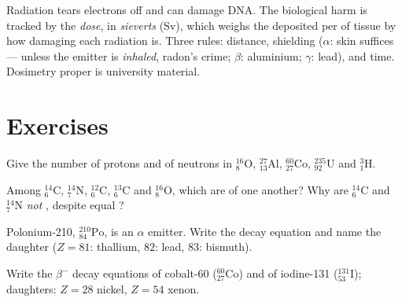 \begin{remark}\label{rem:g11:nucleus-radioactivity:dose}
Radiation tears electrons off  and can damage DNA. The biological
harm is tracked by the \emph{dose}, in
\emph{sieverts} (\unit{Sv}), which
weighs the  deposited per  of tissue by how damaging each
radiation is. Three rules: distance, shielding ($\alpha$: skin suffices ---
unless the emitter is \emph{inhaled}, radon's crime; $\beta$: aluminium;
$\gamma$: lead), and time. Dosimetry proper is university material.
\end{remark}

\section{Exercises}

\begin{exercise}[$\star$]\label{exo:g11:nucleus-radioactivity:1}
Give the number of protons and of neutrons in ${}^{16}_{8}\mathrm{O}$,
${}^{27}_{13}\mathrm{Al}$, ${}^{60}_{27}\mathrm{Co}$, ${}^{235}_{92}\mathrm{U}$
and ${}^{3}_{1}\mathrm{H}$.
\end{exercise}

\begin{exercise}[$\star$]\label{exo:g11:nucleus-radioactivity:2}
Among ${}^{14}_{6}\mathrm{C}$, ${}^{14}_{7}\mathrm{N}$, ${}^{12}_{6}\mathrm{C}$,
${}^{13}_{6}\mathrm{C}$ and ${}^{16}_{8}\mathrm{O}$, which are  of one
another? Why are ${}^{14}_{6}\mathrm{C}$ and ${}^{14}_{7}\mathrm{N}$ \emph{not}
, despite equal ?
\end{exercise}

\begin{exercise}[$\star$]\label{exo:g11:nucleus-radioactivity:3}
Polonium-210, ${}^{210}_{84}\mathrm{Po}$, is an $\alpha$ emitter. Write the
decay equation and name the daughter ($Z = 81$: thallium, $82$: lead, $83$:
bismuth).
\end{exercise}

\begin{exercise}[$\star$]\label{exo:g11:nucleus-radioactivity:4}
Write the $\beta^-$ decay equations of cobalt-60 (${}^{60}_{27}\mathrm{Co}$)
and of iodine-131 (${}^{131}_{53}\mathrm{I}$); daughters: $Z = 28$ nickel,
$Z = 54$ xenon.
\end{exercise}

